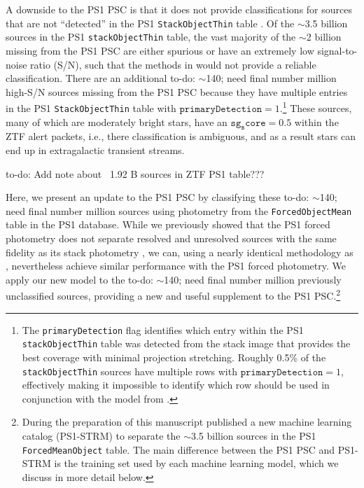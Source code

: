 \documentclass[twocolumn]{aastex63}
\newcommand{\todo}[1]{{\color{magenta} to-do: {#1}}}
\begin{document}
A downside to the PS1 PSC is that it does not provide classifications for
sources that are not ``detected'' in the PS1 \texttt{StackObjectThin} table
\citep[the definition of a PS1 stack detection is given in][]{Tachibana18}. Of
the $\sim$3.5 billion sources in the PS1 \texttt{stackObjectThin} table, the
vast majority of the $\sim$2 billion missing from the PS1 PSC are either
spurious or have an extremely low signal-to-noise ratio (S/N), such that the
methods in \citet{Tachibana18} would not provide a reliable classification.
There are an additional \todo{$\sim$140; need final number} million high-S/N
sources missing from the PS1 PSC because they have multiple entries in the PS1
\texttt{StackObjectThin} table with $\mathtt{primaryDetection} =
1$.\footnote{The \texttt{primaryDetection} flag identifies which entry within
the PS1 \texttt{stackObjectThin} table was detected from the stack image that
provides the best coverage with minimal projection stretching. Roughly 0.5\%
of the \texttt{stackObjectThin} sources have multiple rows with
$\mathtt{primaryDetection} = 1$, effectively making it impossible to identify
which row should be used in conjunction with the model from
\citet{Tachibana18}.} These sources, many of which are moderately bright
stars, have an $\mathtt{sg_score} = 0.5$ within the ZTF alert packets, i.e.,
there classification is ambiguous, and as a result stars can end up in
extragalactic transient streams.

\todo{Add note about ~1.92 B sources in ZTF PS1 table???}

Here, we present an update to the PS1 PSC by classifying these
\todo{$\sim$140; need final number} million sources using photometry from the
\texttt{ForcedObjectMean} table in the PS1 database. While we previously
showed that the PS1 forced photometry does not separate resolved and
unresolved sources with the same fidelity as its stack photometry
\citep{Tachibana18}, we can, using a nearly identical methodology as
\citet{Tachibana18}, nevertheless achieve similar performance with the PS1
forced photometry. We apply our new model to the \todo{$\sim$140; need final
number} million previously unclassified sources, providing a new and useful
supplement to the PS1 PSC.\footnote{During the preparation of this manuscript
\citet{Beck20} published a new machine learning catalog (PS1-STRM) to separate
the $\sim$3.5 billion sources in the PS1 \texttt{ForcedMeanObject} table. The
main difference between the PS1 PSC and PS1-STRM is the training set used by
each machine learning model, which we discuss in more detail below.}
\end{document}
